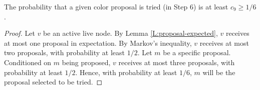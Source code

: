 \begin{lemma}
  The probability that a given color proposal is tried (in Step 6) is at least $c_9 \ge 1/6$.
\label{L:proposal-tried}
\end{lemma}
\begin{proof}
Let $v$ be an active live node.
By Lemma \ref{L:proposal-expected}, $v$ receives at most one proposal in expectation.
By Markov's inequality, $v$ receives at most two proposals, with probability at least $1/2$. Let $m$ be a specific proposal. 
Conditioned on $m$ being proposed, $v$ receives at most three proposals, with probability at least $1/2$. Hence, with probability at least $1/6$, $m$ will be the proposal selected to be tried.
\end{proof}

